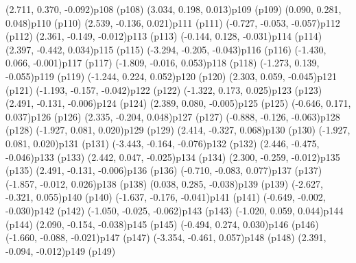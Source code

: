 \psPoint(2.711, 0.370, -0.092){p108}
\psdot(p108)
\psPoint(3.034, 0.198, 0.013){p109}
\psdot(p109)
\psPoint(0.090, 0.281, 0.048){p110}
\psdot(p110)
\psPoint(2.539, -0.136, 0.021){p111}
\psdot(p111)
\psPoint(-0.727, -0.053, -0.057){p112}
\psdot(p112)
\psPoint(2.361, -0.149, -0.012){p113}
\psdot(p113)
\psPoint(-0.144, 0.128, -0.031){p114}
\psdot(p114)
\psPoint(2.397, -0.442, 0.034){p115}
\psdot(p115)
\psPoint(-3.294, -0.205, -0.043){p116}
\psdot(p116)
\psPoint(-1.430, 0.066, -0.001){p117}
\psdot(p117)
\psPoint(-1.809, -0.016, 0.053){p118}
\psdot(p118)
\psPoint(-1.273, 0.139, -0.055){p119}
\psdot(p119)
\psPoint(-1.244, 0.224, 0.052){p120}
\psdot(p120)
\psPoint(2.303, 0.059, -0.045){p121}
\psdot(p121)
\psPoint(-1.193, -0.157, -0.042){p122}
\psdot(p122)
\psPoint(-1.322, 0.173, 0.025){p123}
\psdot(p123)
\psPoint(2.491, -0.131, -0.006){p124}
\psdot(p124)
\psPoint(2.389, 0.080, -0.005){p125}
\psdot(p125)
\psPoint(-0.646, 0.171, 0.037){p126}
\psdot(p126)
\psPoint(2.335, -0.204, 0.048){p127}
\psdot(p127)
\psPoint(-0.888, -0.126, -0.063){p128}
\psdot(p128)
\psPoint(-1.927, 0.081, 0.020){p129}
\psdot(p129)
\psPoint(2.414, -0.327, 0.068){p130}
\psdot(p130)
\psPoint(-1.927, 0.081, 0.020){p131}
\psdot(p131)
\psPoint(-3.443, -0.164, -0.076){p132}
\psdot(p132)
\psPoint(2.446, -0.475, -0.046){p133}
\psdot(p133)
\psPoint(2.442, 0.047, -0.025){p134}
\psdot(p134)
\psPoint(2.300, -0.259, -0.012){p135}
\psdot(p135)
\psPoint(2.491, -0.131, -0.006){p136}
\psdot(p136)
\psPoint(-0.710, -0.083, 0.077){p137}
\psdot(p137)
\psPoint(-1.857, -0.012, 0.026){p138}
\psdot(p138)
\psPoint(0.038, 0.285, -0.038){p139}
\psdot(p139)
\psPoint(-2.627, -0.321, 0.055){p140}
\psdot(p140)
\psPoint(-1.637, -0.176, -0.041){p141}
\psdot(p141)
\psPoint(-0.649, -0.002, -0.030){p142}
\psdot(p142)
\psPoint(-1.050, -0.025, -0.062){p143}
\psdot(p143)
\psPoint(-1.020, 0.059, 0.044){p144}
\psdot(p144)
\psPoint(2.090, -0.154, -0.038){p145}
\psdot(p145)
\psPoint(-0.494, 0.274, 0.030){p146}
\psdot(p146)
\psPoint(-1.660, -0.088, -0.021){p147}
\psdot(p147)
\psPoint(-3.354, -0.461, 0.057){p148}
\psdot(p148)
\psPoint(2.391, -0.094, -0.012){p149}
\psdot(p149)
